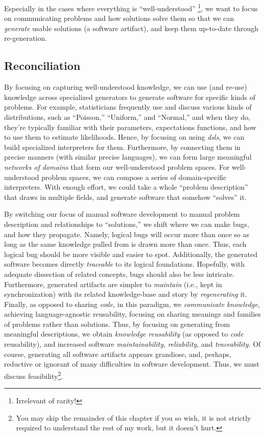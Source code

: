 Especially in the cases where everything is ``well-understood''
\cite{well-understood}\footnote{Irrelevant of rarity!}, we want to focus on
communicating problems and how solutions solve them so that we can
\textit{generate} usable solutions (a software artifact), and keep them
up-to-date through re-generation.

\subsection{Reconciliation}
\label{chap:ideology:sec:thoughts_of_generation:subsec:reconciliation}

By focusing on capturing well-understood \cite{well-understood} knowledge, we
can use (and re-use) knowledge across specialized generators to generate
software for specific kinds of problems. For example, statisticians frequently
use and discuss various kinds of distributions, such as ``Poisson,''
``Uniform,'' and ``Normal,'' and when they do, they're typically familiar with
their parameters, expectations functions, and how to use them to estimate
likelihoods. Hence, by focusing on using \textit{\acsp{dsl}}, we can build
specialized interpreters for them. Furthermore, by connecting them in precise
manners (with similar precise languages), we can form large meaningful
\textit{networks of domains} \cite{Czarnecki2005} that form our well-understood
problem spaces. For well-understood problem spaces, we can compose a series of
domain-specific interpreters. With enough effort, we could take a whole
``problem description'' that draws in multiple fields, and generate software
that somehow ``solves'' it.

By switching our focus of manual software development to manual problem
description and relationships to ``solutions,'' we shift where we can make bugs,
and how they propagate. Namely, logical bugs will occur more than once so as
long as the same knowledge pulled from is drawn more than once. Thus, each
logical bug should be more visible and easier to spot. Additionally, the
generated software becomes directly \textit{traceable} to its logical
foundations. Hopefully, with adequate dissection of related concepts, bugs
should also be less intricate. Furthermore, generated artifacts are simpler to
\textit{maintain} (i.e., kept in synchronization) with its related
knowledge-base and story by \textit{regenerating} it. Finally, as opposed to
sharing \textit{code}, in this paradigm, we \textit{communicate knowledge},
achieving language-agnostic reusability, focusing on sharing meanings and
families of problems rather than solutions. Thus, by focusing on generating from
meaningful descriptions, we obtain \textit{knowledge reusability} (as opposed to
\textit{code} reusability), and increased software \textit{maintainability},
\textit{reliability}, and \textit{traceability}. Of course, generating all
software artifacts appears grandiose, and, perhaps, reductive or ignorant of
many difficulties in software development. Thus, we must discuss
feasibility\footnote{You may skip the remainder of this chapter if you so wish,
it is not strictly required to understand the rest of my work, but it doesn't
hurt.}.

